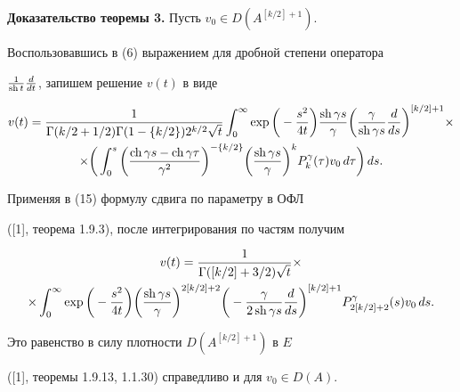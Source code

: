 {\bf Доказательство теоремы 3.} Пусть $v_0\in D(A^{[k/2]+1})$.


Воспользовавшись в (6) выражением для дробной степени оператора


$\frac{1}{\operatorname{sh} t} \frac{d}{dt}$, запишем решение $v(t)$ в виде


\begin{multline}


v(t)=\frac{1}{\Gamma(k/2+1/2)\Gamma(1-\{k/2\})2^{k/2}\sqrt{t}}


\int_0^\infty \exp\bigg (-\frac{s^2}{4t}\bigg )


\frac{\sh \gamma s}{\gamma}


\bigg(\frac{\gamma}{\sh \gamma s} \frac{d}{ds}\bigg )^{[k/2]+1}\times\\


%


\times \bigg( \int_0^s


\bigg(\frac{\ch \gamma s-\ch \gamma \tau}{\gamma^2}\bigg )^{-\{k/2\}}


\bigg(\frac{\sh \gamma s}{\gamma }\bigg )^k


P_k^\gamma(\tau)v_0\, d\tau \bigg)\, ds.


\end{multline}


Применяя в (15) формулу сдвига по параметру в ОФЛ


([1], теорема 1.9.3), после интегрирования по частям получим


\begin{multline}


v(t)=\frac{1}{\Gamma([k/2]+3/2)\sqrt{t}} \times\\


%


\times \int_0^\infty \exp\bigg (-\frac{s^2}{4t}\bigg )


\bigg( \frac{\sh \gamma s}{\gamma }\bigg)^{2[k/2]+2}


\bigg(-\frac{\gamma}{2\sh \gamma s} \frac{d}{ds}\bigg )^{[k/2]+1}


P_{2[k/2]+2}^\gamma(s)v_0\, ds.


\end{multline}





Это равенство в силу плотности $D(A^{[k/2]+1})$ в $E$


([1], теоремы 1.9.13, 1.1.30) справедливо и для $v_0\in D(A)$.





